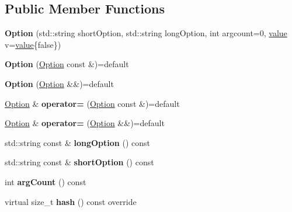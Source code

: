 \subsection*{Public Member Functions}
\begin{DoxyCompactItemize}
\item 
\mbox{\label{classdocopt_1_1Option_a1da09cf8c24b9e40450f5d22ec26502d}} 
{\bfseries Option} (std\+::string short\+Option, std\+::string long\+Option, int argcount=0, \hyperlink{structdocopt_1_1value}{value} v=\hyperlink{structdocopt_1_1value}{value}\{false\})
\item 
\mbox{\label{classdocopt_1_1Option_af3996b856bd191cf0712ed34fa916f07}} 
{\bfseries Option} (\hyperlink{classdocopt_1_1Option}{Option} const \&)=default
\item 
\mbox{\label{classdocopt_1_1Option_ac3860cc101da72b4309d6e58646c1441}} 
{\bfseries Option} (\hyperlink{classdocopt_1_1Option}{Option} \&\&)=default
\item 
\mbox{\label{classdocopt_1_1Option_a48eaf5c2cf58bcdca3246692ec50248f}} 
\hyperlink{classdocopt_1_1Option}{Option} \& {\bfseries operator=} (\hyperlink{classdocopt_1_1Option}{Option} const \&)=default
\item 
\mbox{\label{classdocopt_1_1Option_acdfcb2a8b52d42ad94d756208141beb7}} 
\hyperlink{classdocopt_1_1Option}{Option} \& {\bfseries operator=} (\hyperlink{classdocopt_1_1Option}{Option} \&\&)=default
\item 
\mbox{\label{classdocopt_1_1Option_ab7d5c918813d3c5414ff418bab3ed6e9}} 
std\+::string const  \& {\bfseries long\+Option} () const
\item 
\mbox{\label{classdocopt_1_1Option_a7c1a506e66873d965dbb97dfd165b295}} 
std\+::string const  \& {\bfseries short\+Option} () const
\item 
\mbox{\label{classdocopt_1_1Option_a76ef24dea8376a828eeb53daadc3c1dd}} 
int {\bfseries arg\+Count} () const
\item 
\mbox{\label{classdocopt_1_1Option_a98ea6657e77e1f78baaace69486bef6a}} 
virtual size\+\_\+t {\bfseries hash} () const override
\end{DoxyCompactItemize}
